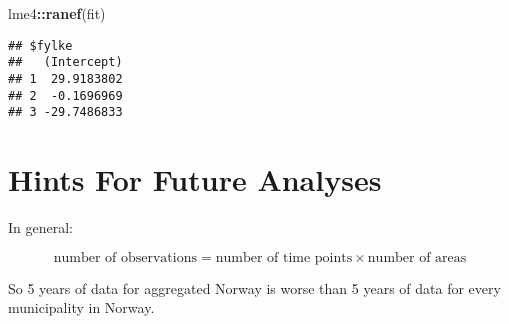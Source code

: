 \documentclass[]{book}
\newenvironment{Shaded}{\begin{snugshade}}{\end{snugshade}}
\newcommand{\KeywordTok}[1]{\textcolor[rgb]{0.13,0.29,0.53}{\textbf{#1}}}
\newcommand{\OperatorTok}[1]{\textcolor[rgb]{0.81,0.36,0.00}{\textbf{#1}}}
\newcommand{\NormalTok}[1]{#1}
\begin{document}
\begin{Shaded}
\begin{Highlighting}[]
\NormalTok{lme4}\OperatorTok{::}\KeywordTok{ranef}\NormalTok{(fit)}
\end{Highlighting}
\end{Shaded}

\begin{verbatim}
## $fylke
##   (Intercept)
## 1  29.9183802
## 2  -0.1696969
## 3 -29.7486833
\end{verbatim}

\section{Hints For Future Analyses}\label{hints-for-future-analyses-1}

In general:

\[\text{number of observations} = \text{number of time points} \times \text{number of areas}\]

So 5 years of data for aggregated Norway is worse than 5 years of data
for every municipality in Norway.


\end{document}
